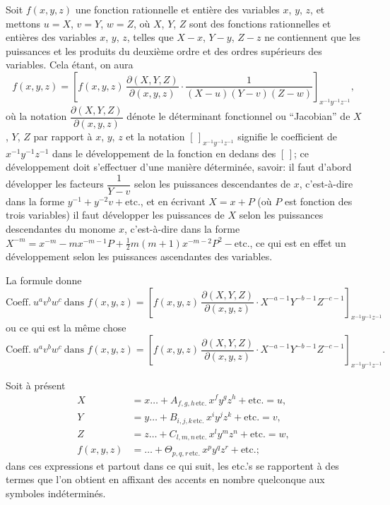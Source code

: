 \documentclass[11pt,a4paper]{book}
\theoremstyle{plain}
\begin{document}
Soit $f(x,y,z)$ une fonction rationnelle et enti\`{e}re des variables $x$, $y$, $z$, et mettons $u=X$, $v=Y$, $w=Z$, o\`{u} $X$, $Y$, $Z$ sont des fonctions rationnelles et enti\`{e}res des variables $x$, $y$, $z$, telles que $X-x$, $Y-y$, $Z-z$ ne contiennent que les puissances et les produits du deuxi\`{e}me ordre et des ordres sup\'{e}rieurs des variables. Cela \'{e}tant, on aura
\[
f(x,y,z)=\left[f(x,y,z)\,\frac{\partial(X,Y,Z)}{\partial(x,y,z)}\cdot\frac{1}{(X-u)(Y-v)(Z-w)}\right]_{x^{-1}y^{-1}z^{-1}},
\]
o\`{u} la notation $\dfrac{\partial(X,Y,Z)}{\partial(x,y,z)}$ d\'{e}note le d\'{e}terminant fonctionnel ou ``Jacobian'' de $X$, $Y$, $Z$ par rapport \`{a} $x$, $y$, $z$ et la notation $[\,]_{x^{-1}y^{-1}z^{-1}}$ signifie le coefficient de $x^{-1}y^{-1}z^{-1}$ dans le d\'{e}veloppement de la fonction en dedans des $[\,]$; ce d\'{e}veloppement doit s'effectuer d'une mani\`{e}re d\'{e}termin\'{e}e, savoir: il faut d'abord d\'{e}velopper les facteurs $\dfrac{1}{Y-v}$ selon les puissances descendantes de $x$, c'est-\`{a}-dire dans la forme $y^{-1}+y^{-2}v+\text{etc.}$, et en \'{e}crivant $X=x+P$ (o\`{u} $P$ est fonction des trois variables) il faut d\'{e}velopper les puissances de $X$ selon les puissances descendantes du monome $x$, c'est-\`{a}-dire dans la forme $X^{-m}=x^{-m}-mx^{-m-1}P+\tfrac{1}{2}m(m+1)x^{-m-2}P^2-\text{etc.}$, ce qui est en effet un d\'{e}veloppement selon les puissances ascendantes des variables.

La formule donne
\[
\text{Coeff.}\ u^a v^b w^c\ \text{dans }f(x,y,z)=\left[f(x,y,z)\,\frac{\partial(X,Y,Z)}{\partial(x,y,z)}\cdot X^{-a-1}Y^{-b-1}Z^{-c-1}\right]_{x^{-1}y^{-1}z^{-1}}
\]
ou ce qui est la m\^{e}me chose
\[
\text{Coeff.}\ u^a v^b w^c\ \text{dans }f(x,y,z)=\left[f(x,y,z)\,\frac{\partial(X,Y,Z)}{\partial(x,y,z)}\cdot X^{-a-1}Y^{-b-1}Z^{-c-1}\right]_{x^{-1}y^{-1}z^{-1}}.
\]

Soit \`{a} pr\'{e}sent
\begin{align*}
X &= x\ldots+A_{f,g,h\,\text{etc.}}\,x^f y^g z^h+\text{etc.}=u,\\
Y &= y\ldots+B_{i,j,k\,\text{etc.}}\,x^i y^j z^k+\text{etc.}=v,\\
Z &= z\ldots+C_{l,m,n\,\text{etc.}}\,x^l y^m z^n+\text{etc.}=w,\\
f(x,y,z) &= \ldots+\Theta_{p,q,r\,\text{etc.}}\,x^p y^q z^r+\text{etc.};
\end{align*}
dans ces expressions et partout dans ce qui suit, les etc.'s se rapportent \`{a} des termes que l'on obtient en affixant des accents en nombre quelconque aux symboles ind\'{e}termin\'{e}s.
\end{document}
